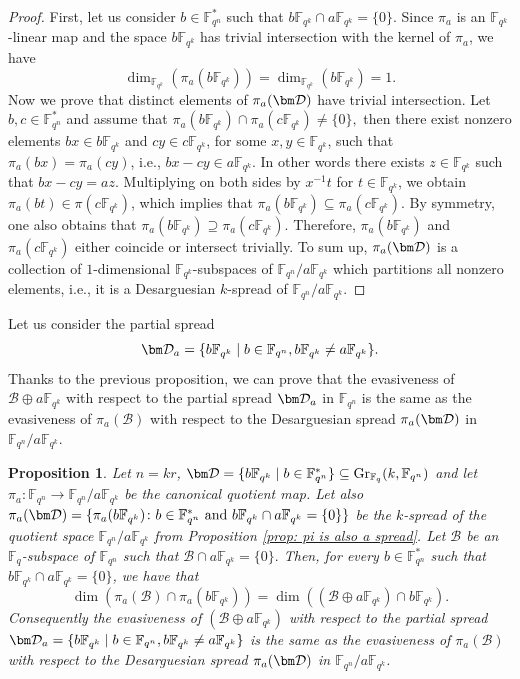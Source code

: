 \documentclass{article}
\newtheorem{proposition}{Proposition}
\newcommand{\Fq}{\mathbb{F}_{q}}
\newcommand{\Fqn}{\mathbb{F}_{q^n}}
\newcommand{\Fqk}{\mathbb{F}_{q^k}}
\newcommand{\calB}{\mathcal{B}}
\newcommand{\calD}{\mathcal{D}}
\begin{document}
\begin{proof}
First, let us consider $b\in\Fqn^*$ such that $b\Fqk\cap a\Fqk=\{0\}$. Since $\pi_a$ is an $\Fqk$-linear map and the space $b\Fqk$ has trivial intersection with the kernel of $\pi_a$, we have
\[
\dim_{\Fqk}(\pi_a(b\Fqk))=\dim_{\Fqk}(b\Fqk)=1.
\]
Now we prove that distinct elements of $\pi_a(\bm \calD)$ have
trivial intersection. 
Let $b,c\in\Fqn^*$ and assume that $\pi_a(b\Fqk)\cap
\pi_a(c\Fqk)\neq\{0\},$ then there exist nonzero elements $bx\in b\Fqk$ and $cy\in c\Fqk$, for some $x,y \in \Fqk$, such that $\pi_a(bx)=\pi_a(cy)$,  i.e.,  $bx-cy \in a\Fqk.$
In other words there exists $z \in \Fqk$ such that
$ bx - cy = az $. Multiplying on both sides by $x^{-1}t$ for $t \in \Fqk$, we obtain $\pi_a(bt) \in \pi(c \Fqk)$, which implies that $\pi_a(b\Fqk ) \subseteq \pi_a(c \Fqk)$. By symmetry, one also obtains that $\pi_a(b\Fqk) \supseteq \pi_a(c\Fqk)$. Therefore, $\pi_a(b\Fqk)$ and $\pi_a(c\Fqk)$ either coincide or intersect trivially.
To sum up, $\pi_a(\bm \calD)$ is a collection of
$1$-dimensional $\Fqk$-subspaces of $\Fqn/a\Fqk$ which partitions all nonzero elements, i.e., it is a Desarguesian $k$-spread of $\Fqn/a\Fqk$.
\end{proof}
 Let us consider the partial spread $$\bm\calD_a = \{b \Fqk \mid b \in \Fqn, b\Fqk \neq a\Fqk \}.$$ Thanks to the previous proposition, we can prove that the evasiveness of $\calB \oplus a\Fqk$ with respect to the partial spread $\bm\calD_a$ in $\Fqn$ is the same as the evasiveness of $\pi_a(\calB)$ with respect to the Desarguesian spread $\pi_a(\bm\calD)$ in $\Fqn/a\Fqk$. 
\begin{proposition}
\label{prop: evasivness still relies pi calB}
Let $n=kr$, $\bm \calD = \{ b \Fqk \mid b \in \Fqn^* \} \subseteq \mathrm{Gr}_{\Fq}(k,\Fqn)$ and let $\pi_a\colon\Fqn\to\Fqn/a\Fqk$ be the canonical quotient map. Let also $\pi_a(\bm \calD)
=
\{\pi_a(b\Fqk)\colon  b\in\Fqn^*\text{ and }b\Fqk\cap a\Fqk=\{0\}\}$ be the $k$-spread of the quotient space $\Fqn/a\Fqk$ from Proposition \ref{prop: pi is also a spread}. Let $\calB$ be an $\Fq$-subspace of $\Fqn$ such that $\calB\cap a\Fqk=\{0\}.$ Then, for every
$b\in\Fqn^*$ such that $b\Fqk\cap a\Fqk=\{0\}$, we have that
\[
\dim\left(\pi_a(\calB)\cap\pi_a(b\Fqk)\right)
=
\dim\left((\mathcal{B}\oplus a\Fqk)\cap b\Fqk\right).
\]
Consequently the evasiveness of $(\calB \oplus a\Fqk)$ with respect to the partial spread $\bm\calD_a = \{b \Fqk \mid b \in \Fqn, b\Fqk \neq a\Fqk \}$ is the same as the evasiveness of $\pi_a(\calB)$ with respect to the Desarguesian spread $\pi_a(\bm\calD)$ in $\Fqn/a\Fqk$.
\end{proposition}
\end{document}
